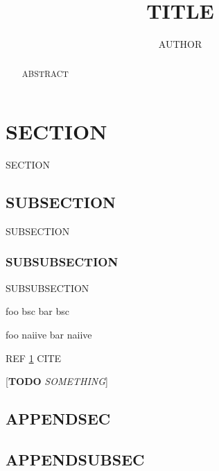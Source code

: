\documentclass[11pt,twoside]{article}
\author{AUTHOR}
\title{TITLE}
\newcommand{\TODO}[1]{[\textbf{TODO} \textsl{#1}]}
\newcommand*{\ShowAbstract}{} %
\newcommand*{\ShowAppendix}{} %
\begin{document}

\maketitle

\ifdefined\ShowAbstract \begin{abstract}
ABSTRACT
\end{abstract} \fi

\setcounter{tocdepth}{2}
\tableofcontents


\clearpage \section{SECTION} %
\label{sec:SECTION}

SECTION

\subsection{SUBSECTION}
SUBSECTION

\subsubsection{SUBSUBSECTION}
SUBSUBSECTION

foo \gls{bsc}
bar \gls{bsc}

foo \gls{naiive}
bar \gls{naiive}

REF \ref{sec:SECTION}
CITE \cite{Shannon1948}

\TODO{SOMETHING}




\clearpage
{}
\printnoidxglossary[sort=letter]

\clearpage
{}
{} %


\ifdefined\ShowAppendix \begin{appendices} %
    \addappheadtotoc
    \appendixpage

    \section{APPENDSEC}
    \label{appendix:APPENDSEC}

    \subsection{APPENDSUBSEC}\label{appendix:APPENDSUBSEC}
    

\end{appendices} \fi %

\end{document}
